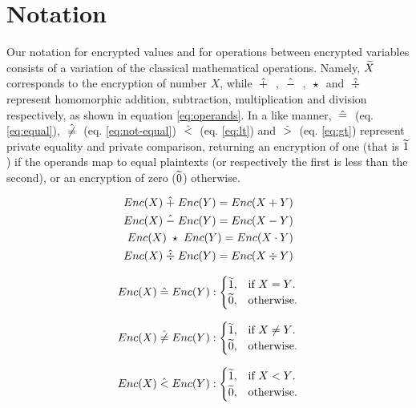 \section{Notation}\label{s:notation}
Our notation for encrypted values and for operations between encrypted variables consists of a variation of the classical mathematical operations.
Namely, $\widetilde{X}$ corresponds to the encryption of number $X$, while $\;\hat{+}\;$ , $\;\hat{-}\;$ , $\;\star\;$ and $\;\hat{\div}\;$ represent homomorphic addition, subtraction, multiplication and division respectively, as shown in equation \ref{eq:operands}.
In a like manner, $\;\hat{=}\;$ (eq. \ref{eq:equal}), $\;\hat{\neq}\;$ (eq. \ref{eq:not-equal}) $\;\hat{<}\;$ (eq. \ref{eq:lt}) and $\;\hat{>}\;$ (eq. \ref{eq:gt}) represent private equality and private comparison, returning an encryption of one (that is $\widetilde{1}$) if the operands map to equal plaintexts (or respectively the first is less than the second), or an encryption of zero ($\widetilde{0}$) otherwise.

\begin{equation}\label{eq:operands}
  \begin{aligned}
      Enc(X) \;\hat{+}\; Enc(Y) = Enc(X + Y)\\
      Enc(X) \;\hat{-}\; Enc(Y) = Enc(X - Y)\\
      Enc(X) \;\star\; Enc(Y) = Enc(X \cdot Y)\\
      Enc(X) \;\hat{\div}\; Enc(Y) = Enc(X \div Y)
  \end{aligned}
\end{equation}

\begin{equation}\label{eq:equal}
  Enc(X) \;\hat{=}\; Enc(Y) :\begin{cases}
    \widetilde{1}, & \text{if $X = Y$}.\\
    \widetilde{0}, & \text{otherwise}.
  \end{cases}
\end{equation}

\begin{equation}\label{eq:not-equal}
  Enc(X) \;\hat{\neq}\; Enc(Y) :\begin{cases}
    \widetilde{1}, & \text{if $X \neq Y$}.\\
    \widetilde{0}, & \text{otherwise}.
  \end{cases}
\end{equation}

\begin{equation}\label{eq:lt}
  Enc(X) \;\hat{<}\; Enc(Y) :\begin{cases}
    \widetilde{1}, & \text{if $X < Y$}.\\
    \widetilde{0}, & \text{otherwise}.
  \end{cases}
\end{equation}


